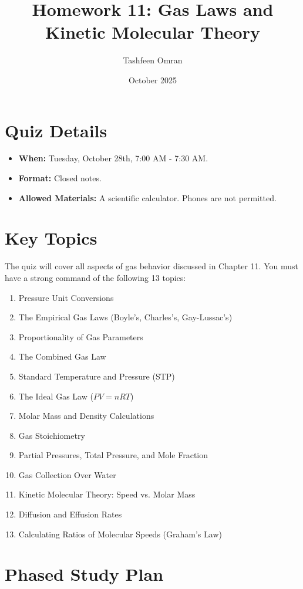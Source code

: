 \documentclass{article}
\title{Homework 11: Gas Laws and Kinetic Molecular Theory}
\author{Tashfeen Omran}
\date{October 2025}
\begin{document}
\maketitle

\section{Quiz Details}
\begin{itemize}
    \item \textbf{When:} Tuesday, October 28th, 7:00 AM - 7:30 AM.
    \item \textbf{Format:} Closed notes.
    \item \textbf{Allowed Materials:} A scientific calculator. Phones are not permitted.
\end{itemize}

\section{Key Topics}
The quiz will cover all aspects of gas behavior discussed in Chapter 11. You must have a strong command of the following 13 topics:
\begin{enumerate}
    \item Pressure Unit Conversions
    \item The Empirical Gas Laws (Boyle's, Charles's, Gay-Lussac's)
    \item Proportionality of Gas Parameters
    \item The Combined Gas Law
    \item Standard Temperature and Pressure (STP)
    \item The Ideal Gas Law ($PV=nRT$)
    \item Molar Mass and Density Calculations
    \item Gas Stoichiometry
    \item Partial Pressures, Total Pressure, and Mole Fraction
    \item Gas Collection Over Water
    \item Kinetic Molecular Theory: Speed vs. Molar Mass
    \item Diffusion and Effusion Rates
    \item Calculating Ratios of Molecular Speeds (Graham's Law)
\end{enumerate}

\section{Phased Study Plan}
\end{document}
